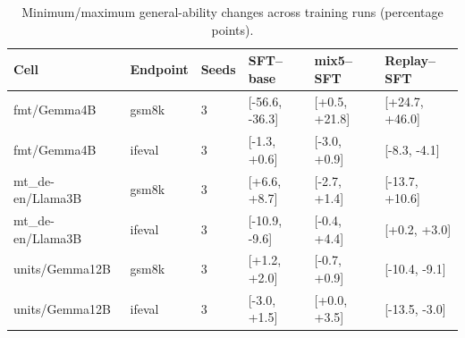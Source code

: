 \begin{table}[t]
\centering\small
\begin{tabular}{llllll}
\toprule
Cell & Endpoint & Seeds & SFT--base & mix5--SFT & Replay--SFT \\
\midrule
fmt/Gemma4B & gsm8k & 3 & [-56.6, -36.3] & [+0.5, +21.8] & [+24.7, +46.0] \\
fmt/Gemma4B & ifeval & 3 & [-1.3, +0.6] & [-3.0, +0.9] & [-8.3, -4.1] \\
mt\_de-en/Llama3B & gsm8k & 3 & [+6.6, +8.7] & [-2.7, +1.4] & [-13.7, +10.6] \\
mt\_de-en/Llama3B & ifeval & 3 & [-10.9, -9.6] & [-0.4, +4.4] & [+0.2, +3.0] \\
units/Gemma12B & gsm8k & 3 & [+1.2, +2.0] & [-0.7, +0.9] & [-10.4, -9.1] \\
units/Gemma12B & ifeval & 3 & [-3.0, +1.5] & [+0.0, +3.5] & [-13.5, -3.0] \\
\bottomrule
\end{tabular}
\caption{Minimum/maximum general-ability changes across training runs (percentage points).}\label{tab:publication-probe-ranges}
\end{table}
